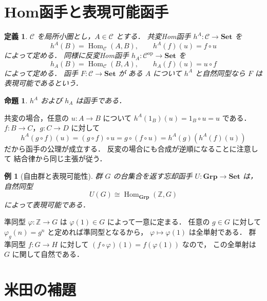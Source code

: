 \documentclass[a5paper,10pt,onecolumn]{jsarticle}
\makeatletter
\theoremstyle{mathnotetheorem}
\newtheorem{definition}[theorem]{定義}
\newtheorem{proposition}[theorem]{命題}
\newtheorem{example}[theorem]{例}
\renewcommand{\proofname}{証明}
\renewenvironment{proof}[1][\proofname]{%
  \par\pushQED{\qed}\normalfont\topsep4\p@\@plus2\p@\relax
  \trivlist\item[\hskip\labelsep\bfseries #1]\ignorespaces
}{\popQED\endtrivlist\@endpefalse}
\makeatother
\begin{document}
\section{Hom函手と表現可能函手}

\begin{definition}
$\mathcal C$ を局所小圏とし，$A\in\mathcal C$ とする．
\emph{共変Hom函手} $h^A:\mathcal C\to\mathbf{Set}$ を
\[
 h^A(B)=\operatorname{Hom}_{\mathcal C}(A,B),\qquad
 h^A(f)(u)=f\circ u
\]
によって定める．
同様に\emph{反変Hom函手}
$h_A:\mathcal C^{\mathrm{op}}\to\mathbf{Set}$ を
\[
 h_A(B)=\operatorname{Hom}_{\mathcal C}(B,A),\qquad
 h_A(f)(u)=u\circ f
\]
によって定める．
函手 $F:\mathcal C\to\mathbf{Set}$ が
ある $A$ について $h^A$ と自然同型なら
$F$ は\emph{表現可能}であるという．
\end{definition}

\begin{proposition}\label{prop:hom-functor}
$h^A$ および $h_A$ は函手である．
\end{proposition}
\begin{proof}
共変の場合，任意の $u:A\to B$ について
$h^A(1_B)(u)=1_B\circ u=u$ である．
$f:B\to C$，$g:C\to D$ に対して
\[
 h^A(g\circ f)(u)=(g\circ f)\circ u
 =g\circ(f\circ u)
 =h^A(g)(h^A(f)(u))
\]
だから函手の公理が成立する．
反変の場合にも合成が逆順になることに注意して
結合律から同じ主張が従う．
\end{proof}

\begin{example}[自由群と表現可能性]
群 $G$ の台集合を返す忘却函手
$U:\mathbf{Grp}\to\mathbf{Set}$ は，
自然同型
\[
 U(G)\cong\operatorname{Hom}_{\mathbf{Grp}}(\mathbb Z,G)
\]
によって表現可能である．
\end{example}
\begin{proof}
準同型 $\varphi:\mathbb Z\to G$ は
$\varphi(1)\in G$ によって一意に定まる．
任意の $g\in G$ に対して
$\varphi_g(n)=g^n$ と定めれば準同型となるから，
$\varphi\mapsto\varphi(1)$ は全単射である．
群準同型 $f:G\to H$ に対して
$(f\circ\varphi)(1)=f(\varphi(1))$ なので，
この全単射は $G$ に関して自然である．
\end{proof}

\section{米田の補題}
\end{document}
